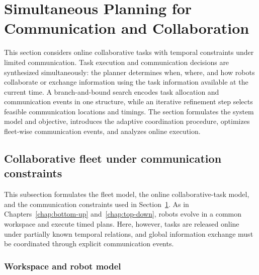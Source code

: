 \section{Simultaneous Planning for Communication and Collaboration}
\label{ch05:sec:ch05_interm_team}

This section considers online collaborative tasks with temporal constraints
under limited communication. Task execution and communication decisions are
synthesized simultaneously: the planner determines when, where, and how robots
collaborate or exchange information using the task information available at the
current time. A branch-and-bound search encodes task allocation and
communication events in one structure, while an iterative refinement step
selects feasible communication locations and timings. The section formulates
the system model and objective, introduces the adaptive coordination procedure,
optimizes fleet-wise communication events, and analyzes online execution.







\subsection{Collaborative fleet under communication constraints}
\label{ch05:sec:problem}

This subsection formulates the fleet model, the online collaborative-task
model, and the communication constraints used in
Section~\ref{ch05:sec:ch05_interm_team}. As in
Chapters~\ref{chap:bottom-up} and~\ref{chap:top-down}, robots evolve in a
common workspace and execute timed plans. Here, however, tasks are released
online under partially known temporal relations, and global information
exchange must be coordinated through explicit communication events.

\subsubsection{Workspace and robot model}
\label{ch05:subsec:env-task-model}

